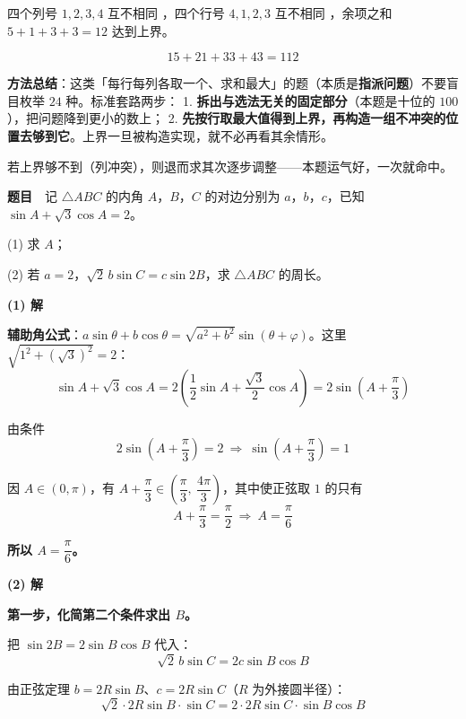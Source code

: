 四个列号 $1,2,3,4$ 互不相同 ，四个行号 $4,1,2,3$ 互不相同 ，余项之和 $5+1+3+3=12$ 达到上界。

\[15+21+33+43=112\]


\begin{gktip}
\textbf{方法总结}：这类「每行每列各取一个、求和最大」的题（本质是\textbf{指派问题}）不要盲目枚举 $24$ 种。标准套路两步：
1. \textbf{拆出与选法无关的固定部分}（本题是十位的 $100$），把问题降到更小的数上；
2. \textbf{先按行取最大值得到上界，再构造一组不冲突的位置去够到它}。上界一旦被构造实现，就不必再看其余情形。

若上界够不到（列冲突），则退而求其次逐步调整——本题运气好，一次就命中。
\end{gktip}

\par\medskip



\textbf{题目}　记 $\triangle ABC$ 的内角 $A$，$B$，$C$ 的对边分别为 $a$，$b$，$c$，已知 $\sin A+\sqrt3\cos A=2$。

  (1) 求 $A$；

  (2) 若 $a=2$，$\sqrt2\,b\sin C=c\sin2B$，求 $\triangle ABC$ 的周长。

\par\medskip

\textbf{(1) 解}

\textbf{辅助角公式}：$a\sin\theta+b\cos\theta=\sqrt{a^{2}+b^{2}}\sin(\theta+\varphi)$。这里 $\sqrt{1^{2}+\left(\sqrt3\right)^{2}}=2$：
\[\sin A+\sqrt3\cos A=2\left(\frac12\sin A+\frac{\sqrt3}2\cos A\right)=2\sin\left(A+\frac\pi3\right)\]

由条件
\[2\sin\left(A+\frac\pi3\right)=2\ \Longrightarrow\ \sin\left(A+\frac\pi3\right)=1\]

因 $A\in(0,\pi)$，有 $A+\dfrac\pi3\in\left(\dfrac\pi3,\ \dfrac{4\pi}3\right)$，其中使正弦取 $1$ 的只有
\[A+\frac\pi3=\frac\pi2\ \Longrightarrow\ A=\frac\pi6\]

\textbf{所以 $A=\dfrac\pi6$。}

\par\medskip

\textbf{(2) 解}

\textbf{第一步，化简第二个条件求出 $B$。}

把 $\sin2B=2\sin B\cos B$ 代入：
\[\sqrt2\,b\sin C=2c\sin B\cos B\]

由正弦定理 $b=2R\sin B$、$c=2R\sin C$（$R$ 为外接圆半径）：
\[\sqrt2\cdot2R\sin B\cdot\sin C=2\cdot2R\sin C\cdot\sin B\cos B\]

